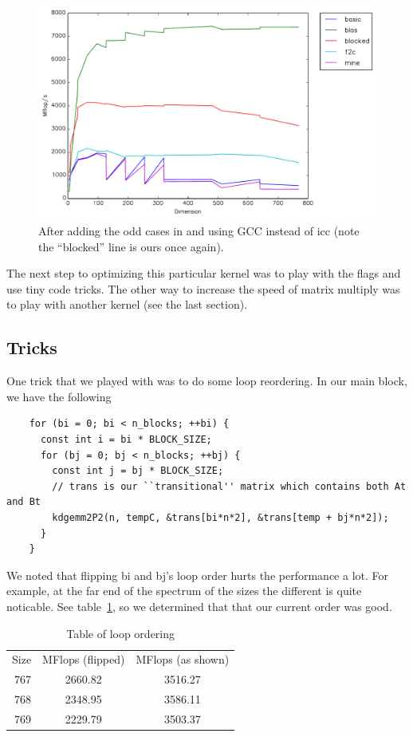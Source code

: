 \documentclass{article}
\begin{document}
  \begin{figure}[h]
    \centering
    \includegraphics[width=.7\textwidth]{odd.pdf}
    \caption{After adding the odd cases in and using GCC instead of icc (note the ``blocked'' line is ours once again).}
    \label{fig:odd}
  \end{figure}

  The next step to optimizing this particular kernel was to play with the flags and use tiny code tricks. The other
  way to increase the speed of matrix multiply was to play with another kernel (see the last section).

  \subsection{Tricks}
    One trick that we played with was to do some loop reordering. In our main block, we have the following

    \begin{lstlisting}
    for (bi = 0; bi < n_blocks; ++bi) {
      const int i = bi * BLOCK_SIZE;
      for (bj = 0; bj < n_blocks; ++bj) {
        const int j = bj * BLOCK_SIZE;
        // trans is our ``transitional'' matrix which contains both At and Bt
        kdgemm2P2(n, tempC, &trans[bi*n*2], &trans[temp + bj*n*2]);
      }
    }
    \end{lstlisting}

    We noted that flipping bi and bj's loop order hurts the performance a lot. For example, at the far end of the spectrum of the sizes
    the different is quite noticable. See table~\ref{tab:looporder}, so we determined that that our current order was good.

    \begin{table}
      \centering
      \begin{tabular}{r c c}
        Size & MFlops (flipped) & MFlops (as shown) \\
        767  & 2660.82 & 3516.27\\
        768  & 2348.95 & 3586.11\\
        769  & 2229.79 & 3503.37
      \end{tabular}
      \caption{Table of loop ordering}
      \label{tab:looporder}
    \end{table}
\end{document}
